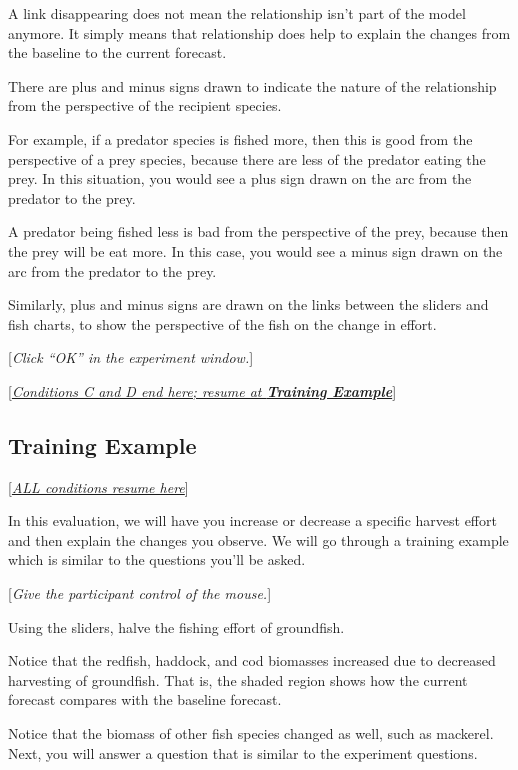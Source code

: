 {{{{\begin{minipage}{0.97\textwidth}
{A link disappearing does not mean the relationship isn't part of the model anymore.  It simply means that relationship does help to explain the changes from the baseline to the current forecast.

There are plus and minus signs drawn to indicate the nature of the relationship from the perspective of the recipient species.

For example, if a predator species is fished more, then this is good from the perspective of a prey species, because there are less of the predator eating the prey.  In this situation, you would see a plus sign drawn on the arc from the predator to the prey.

A predator being fished less is bad from the perspective of the prey, because then the prey will be eat more.  In this case, you would see a minus sign drawn on the arc from the predator to the prey.

Similarly, plus and minus signs are drawn on the links between the sliders and fish charts, to show the perspective of the fish on the change in effort.


[\textit{Click ``OK'' in the experiment window.}]

[\underline{\textit{Conditions C and D end here; resume at \textbf{Training Example}}}]
}
\end{minipage}
}

\subsection{Training Example}

[\underline{\textit{ALL conditions resume here}}]

In this evaluation, we will have you increase or decrease a specific harvest effort and then explain the changes you observe.  We will go through a training example which is similar to the questions you'll be asked.

[\textit{Give the participant control of the mouse.}]

Using the sliders, halve the fishing effort of groundfish.

Notice that the redfish, haddock, and cod biomasses increased due to decreased harvesting of groundfish.  That is, the shaded region shows how the current forecast compares with the baseline forecast.

Notice that the biomass of other fish species changed as well, such as mackerel. Next, you will answer a question that is similar to the experiment questions.

}}}
